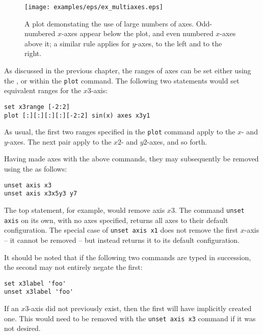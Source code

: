 \begin{figure}
\begin{center}
\texttt{[image: examples/eps/ex\_multiaxes.eps]}
\end{center}
\caption{A plot demonstating the use of large numbers of axes. Odd-numbered
$x$-axes appear below the plot, and even numbered $x$-axes above it; a similar
rule applies for $y$-axes, to the left and to the right.}
\label{fig:ex_multiaxes}
\end{figure}

As discussed in the previous chapter, the ranges of axes can be set either
using the , or within the {\tt plot} command. The following
two statements would set equivalent ranges for the $x3$-axis:

\begin{verbatim}
set x3range [-2:2]
plot [:][:][:][:][-2:2] sin(x) axes x3y1
\end{verbatim}

\noindent As usual, the first two ranges specified in the {\tt plot} command
apply to the $x$- and $y$-axes. The next pair apply to the $x2$- and $y2$-axes,
and so forth.

\label{axis_removal} Having made axes with the above commands, they may
subsequently be removed using the  as follows:

\begin{verbatim}
unset axis x3
unset axis x3x5y3 y7
\end{verbatim}

\noindent The top statement, for example, would remove axis $x3$. The command
{\tt unset axis} on its own, with no axes specified, returns all axes to
their default configuration.  The special case of {\tt unset axis x1} does
not remove the first $x$-axis -- it cannot be removed -- but instead returns it
to its default configuration.

It should be noted that if the following two commands are typed in succession,
the second may not entirely negate the first:

\begin{verbatim}
set x3label 'foo'
unset x3label 'foo'
\end{verbatim}

\noindent If an $x3$-axis did not previously exist, then the first will have
implicitly created one. This would need to be removed with the {\tt unset
axis x3} command if it was not desired.

